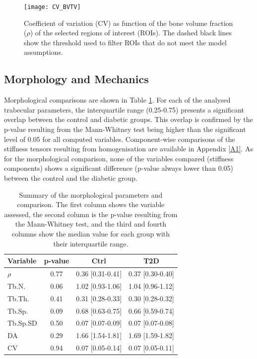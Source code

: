 \documentclass[a4paper,fleqn]{DC_ArtStyle}
\begin{document}
	\begin{figure}
		\centering
		\texttt{[image: CV\_BVTV]}
		\caption{Coefficient of variation (CV) as function of the bone volume fraction ($\rho$) of the selected regions of interest (ROIs).
				 The dashed black lines show the threshold used to filter ROIs that do not meet the model assumptions.}
		\label{FigCVBVTV}
	\end{figure}

	\subsection{Morphology and Mechanics}
	Morphological comparisons are shown in Table \ref{TabMorph}.
	For each of the analysed trabecular parameters, the interquartile range (0.25-0.75) presents a significant overlap between the control and diabetic groups.
	This overlap is confirmed by the p-value resulting from the Mann-Whitney test being higher than the significant level of 0.05 for all computed variables.
	Compo\-nent-wise comparisons of the stiffness tensors resulting from homogenisation are available in Appendix \ref{A1}.
	As for the morphological comparison, none of the variables compared (stiffness components) shows a significant difference (p-value always lower than 0.05) between the control and the diabetic group.
   
	\begin{table}[h!]
		\centering
		\caption{Summary of the morphological parameters and comparison.
				 The first column shows the variable assessed, the second column is the p-value resulting from the Mann-Whitney test, and the third and fourth columns show the median value for each group with their interquartile range.}
		\begin{tabular}{l|ccc}
			Variable & p-value & Ctrl & T2D \\\hline
			$\rho$ & 0.77 & 0.36 [0.31-0.41] & 0.37 [0.30-0.40] \\
			Tb.N. & 0.06 & 1.02 [0.93-1.06] & 1.04 [0.96-1.12] \\
			Tb.Th. &  0.41 & 0.31 [0.28-0.33] & 0.30 [0.28-0.32] \\
			Tb.Sp. & 0.09 & 0.68 [0.63-0.75] & 0.66 [0.59-0.74] \\
			Tb.Sp.SD & 0.50 & 0.07 [0.07-0.09] & 0.07 [0.07-0.08] \\
			DA & 0.29 & 1.66 [1.54-1.81] & 1.69 [1.59-1.82] \\
			CV & 0.94 & 0.07 [0.05-0.14] & 0.07 [0.05-0.11] \\
		\end{tabular}
		\label{TabMorph}
	\end{table}
\end{document}
